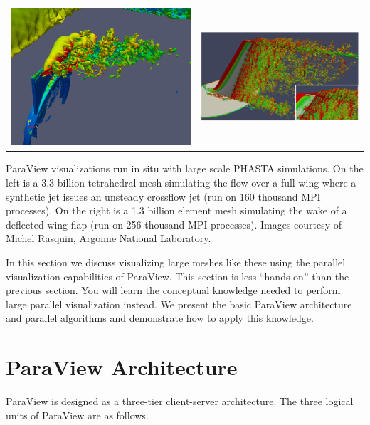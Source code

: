 \begin{inlinefig}
  \begin{tabular}{cc}
    \includegraphics[width=0.383\linewidth]{images/Crossflow} &
    \includegraphics[width=0.517\linewidth]{images/WingWake}
  \end{tabular}
  \parbox{0.95\linewidth}{\footnotesize ParaView visualizations run in situ
    with large scale PHASTA simulations. On the left is a 3.3 billion
    tetrahedral mesh simulating the flow over a full wing where a synthetic
    jet issues an unsteady crossflow jet (run on 160 thousand MPI
    processes). On the right is a 1.3 billion element mesh simulating the
    wake of a deflected wing flap (run on 256 thousand MPI processes).
    Images courtesy of Michel Rasquin, Argonne National Laboratory.}
\end{inlinefig}

In this section we discuss visualizing large meshes like these using the
parallel visualization capabilities of ParaView.  This section is less
``hands-on'' than the previous section.  You will learn the conceptual
knowledge needed to perform large parallel visualization instead.  We
present the basic ParaView architecture and parallel algorithms and
demonstrate how to apply this knowledge.


\section{ParaView Architecture}

ParaView is designed as a three-tier client-server architecture.  The three
logical units of ParaView are as follows.

